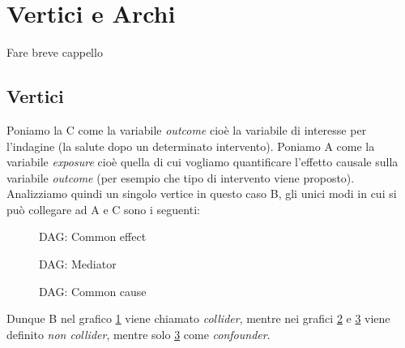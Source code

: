 


\section{Vertici e Archi}
Fare breve cappello

\subsection{Vertici}

Poniamo la C come la variabile \textit{outcome} cioè la variabile di interesse per l'indagine (la salute dopo un determinato intervento). Poniamo A come la variabile \textit{exposure} cioè quella di cui vogliamo quantificare l'effetto causale sulla variabile \textit{outcome} (per esempio che tipo di intervento viene proposto). Analizziamo quindi un singolo vertice in questo caso B, gli unici modi in cui si può collegare ad A e C sono i seguenti: 
\begin{figure}[H]
\centering    
\caption{DAG: Common effect}
\label{DAG:Common effect}
\end{figure} 
\begin{figure}[H]
	\centering
\caption{DAG: Mediator}
\label{DAG:Mediator}
\end{figure} 
\begin{figure}[H]
	\centering
\caption{DAG: Common cause}
\label{DAG:Common cause}
\end{figure}
Dunque B nel grafico \ref{DAG:Common effect} viene chiamato \textit{collider}, mentre nei grafici \ref{DAG:Mediator} e \ref{DAG:Common cause} viene definito \textit{non collider}, mentre solo \ref{DAG:Common cause} come \textit{confounder}.
